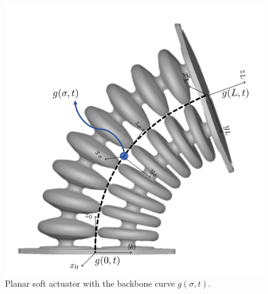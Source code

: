   \begin{minipage}{\linewidth}
      \centering
      \begin{minipage}{0.45\linewidth}
        \begin{figure}[H]
        \centering
            \includegraphics[width=\textwidth]{Figures/Chapter2/actuatorschematic.png}
            \caption{Planar soft actuator with the backbone curve $g(\sigma,t)$.}
            \label{fig2:kinematicschematic}
        \end{figure}
      \end{minipage}
      \hspace{0.05\linewidth}
      \begin{minipage}{0.45\linewidth}
          \begin{figure}[H]

\end{figure}
\end{minipage}
\end{minipage}
